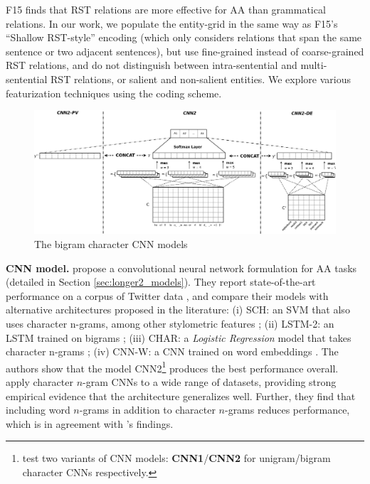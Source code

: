 %

F15 finds that RST relations are more effective for AA than grammatical relations. In our work, we populate the entity-grid in the same way as F15's ``Shallow RST-style'' encoding (which only considers relations that span the same sentence or two adjacent sentences), but use fine-grained instead of coarse-grained RST relations, and do not distinguish between intra-sentential and multi-sentential RST relations, or salient and non-salient entities. 
We explore various featurization techniques using the coding scheme. 
\medskip

\begin{figure}
\includegraphics[width=\linewidth]{plots/longer2_cnn_diagram.png}
\vspace{-1.5em}
\caption{The bigram character CNN models}
\label{fig:cnn2}
\end{figure}

\noindent\textbf{CNN model.}
 propose a convolutional neural network formulation for AA tasks (detailed in Section \ref{sec:longer2_models}).
They report state-of-the-art performance on a corpus of Twitter data \citep{Schwartz:2013}, and compare their models with alternative architectures proposed in the literature:
(i) SCH: an SVM that also uses character n-grams, among other stylometric features \citep{Schwartz:2013};
(ii) LSTM-2: an LSTM trained on bigrams \citep{Tai:2015};
(iii) CHAR: a \emph{Logistic Regression} model that takes character n-grams \citep{Stamatatos:2009};
(iv) CNN-W: a CNN trained on word embeddings \citep{Kalchbrenner:2014}.
The authors show that the model CNN2\footnote{\citet{Shrestha:2017} test two variants of CNN models: \textbf{CNN1}/\textbf{CNN2} for unigram/bigram character CNNs respectively.} produces the best performance overall.
 apply character $n$-gram CNNs to a wide range of datasets, providing strong empirical evidence that the architecture generalizes well. 
Further, they find that including word $n$-grams in addition to character $n$-grams reduces performance, which is in agreement with \citet{Sari:2017}'s findings. 

